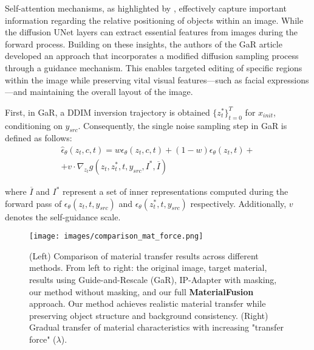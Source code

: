 Self-attention mechanisms, as highlighted by \cite{tumanyan2023plug}, effectively capture important information regarding the relative positioning of objects within an image. While the diffusion UNet layers can extract essential features from images during the forward process. Building on these insights, the authors of the GaR article developed an approach that incorporates a modified diffusion sampling process through a guidance mechanism. This enables targeted editing of specific regions within the image while preserving vital visual features—such as facial expressions—and maintaining the overall layout of the image.

First, in GaR, a DDIM inversion \cite{song2020denoising} trajectory is obtained $\{{z^*_t}\}_{t=0}^T$ for $x_{init}$, conditioning on
$y_{src}$. Consequently, the single noise sampling step in GaR is defined as follows:
\begin{equation}
\begin{split}
  \hat{\epsilon}_{\theta}(z_{t}, c, t) = w\epsilon_{\theta}(z_{t}, c, t) + (1-w)\epsilon_{\theta}(z_{t}, t) + \\  + v \cdot \nabla_{z_t}g(z_t, z_t^*, t, y_{src}, I^{*}, \overline{I})  
  \label{eq:cfg}
\end{split}
\end{equation}

where $\overline{I}$ and $I^*$ represent a set of inner representations computed during the forward pass of $\epsilon_\theta(z_t, t, y_{src})$ and $\epsilon_\theta(z^*_t, t, y_{src})$ respectively. Additionally, $v$ denotes the self-guidance scale.

\begin{figure*}
  \centering
   \vspace{-20pt}
   \texttt{[image: images/comparison\_mat\_force.png]}

   \caption{(Left) Comparison of material transfer results across different methods. From left to right: the original image, target material, results using Guide-and-Rescale (GaR), IP-Adapter with masking, our method without masking, and our full \textbf{MaterialFusion} approach. Our method achieves realistic material transfer while preserving object structure and background consistency. (Right) Gradual transfer of material characteristics with increasing "transfer force" ($\lambda$).}
   \label{fig:gar}

   \vspace{-5pt}
\end{figure*}


